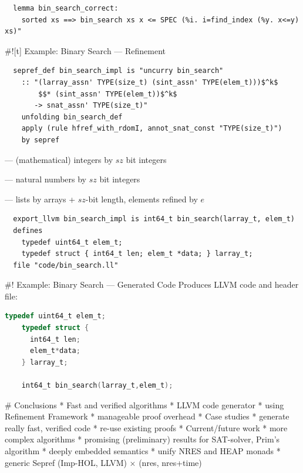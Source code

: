 \documentclass[fleqn]{beamer}
\begin{document}
  \begin{lstlisting}
  lemma bin_search_correct:
    sorted xs ==> bin_search xs x <= SPEC (%i. i=find_index (%y. x<=y) xs)"
  \end{lstlisting}

#![t] Example: Binary Search --- Refinement
  \begin{lstlisting}
  sepref_def bin_search_impl is "uncurry bin_search"
    :: "(larray_assn' TYPE(size_t) (sint_assn' TYPE(elem_t)))$^k$
        $$* (sint_assn' TYPE(elem_t))$^k$
       -> snat_assn' TYPE(size_t)"
    unfolding bin_search_def
    apply (rule hfref_with_rdomI, annot_snat_const "TYPE(size_t)")
    by sepref
  \end{lstlisting}

   {
     --- (mathematical) integers by $sz$ bit integers

     --- natural numbers by $sz$ bit integers

     --- lists by arrays + $sz$-bit length, elements refined by $e$
  }


  \begin{lstlisting}
  export_llvm bin_search_impl is int64_t bin_search(larray_t, elem_t)
  defines
    typedef uint64_t elem_t;
    typedef struct { int64_t len; elem_t *data; } larray_t;
  file "code/bin_search.ll"
  \end{lstlisting}

#! Example: Binary Search --- Generated Code
  Produces LLVM code and header file:
  \begin{lstlisting}[language=C]
    typedef uint64_t elem_t;
    typedef struct {
      int64_t len;
      elem_t*data;
    } larray_t;

    int64_t bin_search(larray_t,elem_t);
  \end{lstlisting}

\renewcommand{\insertsectitle}{}

# Conclusions
  * Fast and verified algorithms
    * LLVM code generator
    * using Refinement Framework
    * manageable proof overhead
  * Case studies
    * generate really fast, verified code
    * re-use existing proofs
  * Current/future work
    * more complex algorithms
      * promising (preliminary) results for SAT-solver, Prim's algorithm
    * deeply embedded semantics
    * unify NRES and HEAP monads
    * generic Sepref (Imp-HOL, LLVM) $\times$ (nres, nres+time)

  \vfill
\end{document}
